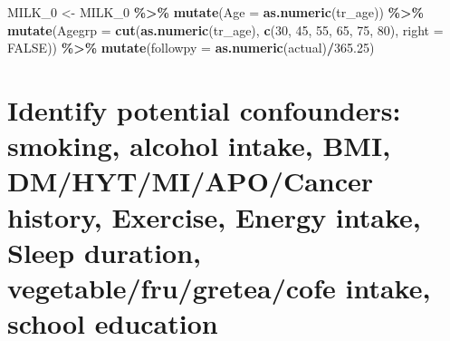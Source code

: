 \documentclass[
]{article}
\newenvironment{Shaded}{\begin{snugshade}}{\end{snugshade}}
\newcommand{\DataTypeTok}[1]{\textcolor[rgb]{0.13,0.29,0.53}{#1}}
\newcommand{\DecValTok}[1]{\textcolor[rgb]{0.00,0.00,0.81}{#1}}
\newcommand{\FloatTok}[1]{\textcolor[rgb]{0.00,0.00,0.81}{#1}}
\newcommand{\KeywordTok}[1]{\textcolor[rgb]{0.13,0.29,0.53}{\textbf{#1}}}
\newcommand{\NormalTok}[1]{#1}
\newcommand{\OperatorTok}[1]{\textcolor[rgb]{0.81,0.36,0.00}{\textbf{#1}}}
\newcommand{\OtherTok}[1]{\textcolor[rgb]{0.56,0.35,0.01}{#1}}
\newcommand{\StringTok}[1]{\textcolor[rgb]{0.31,0.60,0.02}{#1}}
\begin{document}
\begin{Shaded}
\begin{Highlighting}[]
\NormalTok{MILK\_}\DecValTok{0}\NormalTok{ \textless{}{-}}\StringTok{ }\NormalTok{MILK\_}\DecValTok{0} \OperatorTok{\%\textgreater{}\%}\StringTok{ }
\StringTok{  }\KeywordTok{mutate}\NormalTok{(}\DataTypeTok{Age =} \KeywordTok{as.numeric}\NormalTok{(tr\_age)) }\OperatorTok{\%\textgreater{}\%}\StringTok{ }
\StringTok{  }\KeywordTok{mutate}\NormalTok{(}\DataTypeTok{Agegrp =} \KeywordTok{cut}\NormalTok{(}\KeywordTok{as.numeric}\NormalTok{(tr\_age), }\KeywordTok{c}\NormalTok{(}\DecValTok{30}\NormalTok{, }\DecValTok{45}\NormalTok{, }\DecValTok{55}\NormalTok{, }\DecValTok{65}\NormalTok{, }\DecValTok{75}\NormalTok{, }\DecValTok{80}\NormalTok{), }\DataTypeTok{right =} \OtherTok{FALSE}\NormalTok{)) }\OperatorTok{\%\textgreater{}\%}\StringTok{ }
\StringTok{  }\KeywordTok{mutate}\NormalTok{(}\DataTypeTok{followpy =} \KeywordTok{as.numeric}\NormalTok{(actual)}\OperatorTok{/}\FloatTok{365.25}\NormalTok{) }
\end{Highlighting}
\end{Shaded}

\hypertarget{identify-potential-confounders-smoking-alcohol-intake-bmi-dmhytmiapocancer-history-exercise-energy-intake-sleep-duration-vegetablefrugreteacofe-intake-school-education}{%
\section{Identify potential confounders: smoking, alcohol intake, BMI,
DM/HYT/MI/APO/Cancer history, Exercise, Energy intake, Sleep duration,
vegetable/fru/gretea/cofe intake, school
education}\label{identify-potential-confounders-smoking-alcohol-intake-bmi-dmhytmiapocancer-history-exercise-energy-intake-sleep-duration-vegetablefrugreteacofe-intake-school-education}}
\end{document}
